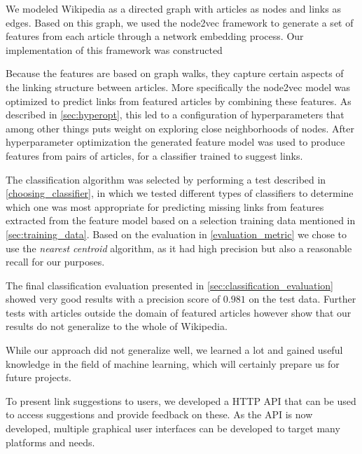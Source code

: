 We modeled Wikipedia as a directed graph with articles as nodes and links as edges. Based on this graph, we used the node2vec framework to generate a set of features from each article through a network embedding process. Our implementation of this framework was constructed 




Because the features are based on graph walks, they capture certain aspects of the linking structure between articles. More specifically the node2vec model was optimized to predict links from featured articles by combining these features. As described in \cref{sec:hyperopt}, this led to a configuration of hyperparameters that among other things puts weight on exploring close neighborhoods of nodes. After hyperparameter optimization the generated feature model was used to produce features from pairs of articles, for a classifier trained to suggest links.

The classification algorithm was selected by performing a test described in \cref{choosing_classifier}, in which we tested different types of classifiers to determine which one was most appropriate for predicting missing links from features extracted from the feature model based on a selection training data mentioned in \cref{sec:training_data}. Based on the evaluation in \cref{evaluation_metric} we chose to use the \emph{nearest centroid} algorithm, as it had high precision but also a reasonable recall for our purposes. 

The final classification evaluation presented in \cref{sec:classification_evaluation} showed very good results with a precision score of $0.981$ on the test data. Further tests with articles outside the domain of featured articles however show that our results do not generalize to the whole of Wikipedia. 

While our approach did not generalize well, we learned a lot and gained useful knowledge in the field of machine learning, which will certainly prepare us for future projects.

To present link suggestions to users, we developed a HTTP API that can be used to access suggestions and provide feedback on these. As the API is now developed, multiple graphical user interfaces can be developed to target many platforms and needs.
